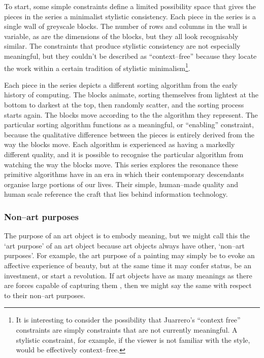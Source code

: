 \documentclass[letter:wpaper]{article}
\begin{document}
    To start, some simple constraints define a limited possibility space that gives the pieces in the series a minimalist stylistic consistency. Each piece in the series is a single wall of greyscale blocks. The number of rows and columns in the wall is variable, as are the dimensions of the blocks, but they all look recognisably similar. The constraints that produce stylistic consistency are not especially meaningful, but they couldn't be described as “context–free” because they locate the work within a certain tradition of stylistic minimalism\footnote{
        It is interesting to consider the possibility that Juarrero's “context free” constraints are simply constraints that are not currently meaningful. A stylistic constraint, for example, if the viewer is not familiar with the style, would be effectively context–free.
    }.
    
    Each piece in the series depicts a different sorting algorithm from the early history of computing. The blocks animate, sorting themselves from lightest at the bottom to darkest at the top, then randomly scatter, and the sorting process starts again. The blocks move according to the the algorithm they represent. The particular sorting algorithm functions as a meaningful, or “enabling” constraint, because the qualitative difference between the pieces is entirely derived from the way the blocks move. Each algorithm is experienced as having a markedly different quality, and it is possible to recognise the particular algorithm from watching the way the blocks move. This series explores the resonance these primitive algorithms have in an era in which their contemporary descendants organise large portions of our lives. Their simple, human–made quality and human scale reference the craft that lies behind information technology.

    \subsubsection{Non–art purposes}

    The purpose of an art object is to embody meaning, but we might call this the ‘art purpose’ of an art object because art objects always have other, ‘non–art purposes’. For example, the art purpose of a painting may simply be to evoke an affective experience of beauty, but at the same time it may confer status, be an investment, or start a revolution. If art objects have as many meanings as there are forces capable of capturing them \citep[p.4]{DeleuzeNtschAndPhlsphy2006}, then we might say the same with respect to their non–art purposes.
\end{document}
